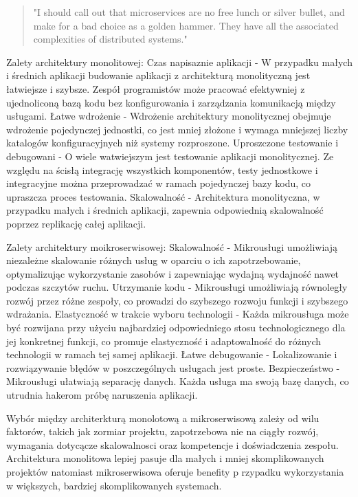 \documentclass[runningheads,12pt]{llncs} \usepackage{graphicx} \usepackage{todonotes} \usepackage{fancyhdr} \usepackage{lipsum} \usepackage[T1]{fontenc} \usepackage[provide=*,english,polish]{babel}
\begin{document}
\begin{quote}
    "I should call out that microservices are no free lunch or silver bullet, and make for a bad choice as a golden hammer. They have all the associated complexities of distributed systems."~\cite[p. 11]{newman2015building}
\end{quote}

Zalety architektury monolitowej: 
Czas napisaznie aplikacji - W przypadku małych i średnich aplikacji budowanie aplikacji z architekturą monolityczną jest łatwiejsze i szybsze. Zespół programistów może pracować efektywniej z ujednoliconą bazą kodu bez konfigurowania i zarządzania komunikacją między usługami.
Łatwe wdrożenie - Wdrożenie architektury monolitycznej obejmuje wdrożenie pojedynczej jednostki, co jest mniej złożone i wymaga mniejszej liczby katalogów konfiguracyjnych niż systemy rozproszone.
Uproszczone testowanie i debugowani - O wiele watwiejszym jest testowanie aplikacji monolitycznej. Ze względu na ścisłą integrację wszystkich komponentów, testy jednostkowe i integracyjne można przeprowadzać w ramach pojedynczej bazy kodu, co upraszcza proces testowania.
Skalowalność - Architektura monolityczna, w przypadku małych i średnich aplikacji, zapewnia odpowiednią skalowalność poprzez replikację całej aplikacji.~\cite{sharma2023monolithic}

Zalety architektury moikroserwisowej:
Skalowalność - Mikrousługi umożliwiają niezależne skalowanie różnych usług w oparciu o ich zapotrzebowanie, optymalizując wykorzystanie zasobów i zapewniając wydajną wydajność nawet podczas szczytów ruchu.
Utrzymanie kodu - Mikrousługi umożliwiają równoległy rozwój przez różne zespoły, co prowadzi do szybszego rozwoju funkcji i szybszego wdrażania.
Elastyczność w trakcie wyboru technologii - Każda mikrousługa może być rozwijana przy użyciu najbardziej odpowiedniego stosu technologicznego dla jej konkretnej funkcji, co promuje elastyczność i adaptowalność do różnych technologii w ramach tej samej aplikacji.
Łatwe debugowanie - Lokalizowanie i rozwiązywanie błędów w poszczególnych usługach jest proste.
Bezpieczeństwo - Mikrousługi ułatwiają separację danych. Każda usługa ma swoją bazę danych, co utrudnia hakerom próbę naruszenia aplikacji.~\cite{sharma2023monolithic}

Wybór między architerkturą monolotową a mikroserwisową zależy od wilu faktorów, takich jak zormiar projektu, zapotrzebowa nie na ciągły rozwój, wymagania dotycącze skalowalnosci oraz kompetencje i doświadczenia zespołu. Architektura monolitowa lepiej pasuje dla małych i mniej skomplikowanych projektów natomiast mikroserwisowa oferuje benefity p rzypadku wykorzystania w większych, bardziej skomplikowanych systemach.
\end{document}
